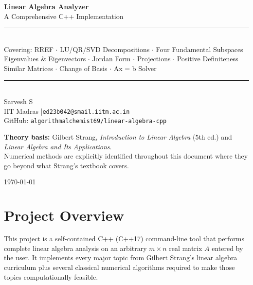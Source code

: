 \documentclass[12pt, a4paper]{article}
\begin{document}
\begin{titlepage}
\centering
\vspace*{2cm}
{\huge\bfseries\color{strangblue} Linear Algebra Analyzer}\\[0.5em]
{\large\color{gray} A Comprehensive C++ Implementation}\\[2em]
\rule{0.7\textwidth}{0.5pt}\\[1.5em]
{\normalsize
  Covering: RREF $\cdot$ LU/QR/SVD Decompositions $\cdot$ Four Fundamental Subspaces\\[0.3em]
  Eigenvalues \& Eigenvectors $\cdot$ Jordan Form $\cdot$ Projections $\cdot$ Positive Definiteness\\[0.3em]
  Similar Matrices $\cdot$ Change of Basis $\cdot$ Ax = b Solver
}\\[1.5em]
\rule{0.7\textwidth}{0.5pt}\\[2em]

{\large Sarvesh S}\\[0.4em]
{\small IIT Madras \quad|\quad \texttt{ed23b042@smail.iitm.ac.in}}\\[1em]
{\small\color{gray} GitHub: \texttt{algorithmalchemist69/linear-algebra-cpp}}\\[3em]

\begin{tcolorbox}[colback=lightblue, colframe=strangblue, width=0.75\textwidth,
  arc=6pt, boxrule=0.8pt]
\centering\small
\textbf{Theory basis:} Gilbert Strang, \emph{Introduction to Linear Algebra}
(5th ed.) and \emph{Linear Algebra and Its Applications}.\\[0.3em]
Numerical methods are explicitly identified throughout this document
where they go beyond what Strang's textbook covers.
\end{tcolorbox}

\vfill
{\small\color{gray}\today}
\end{titlepage}

\tableofcontents
\newpage

\section{Project Overview}

This project is a self-contained C++ (C++17) command-line tool that performs
complete linear algebra analysis on an arbitrary $m \times n$ real matrix $A$
entered by the user.  It implements every major topic from Gilbert Strang's
linear algebra curriculum plus several classical numerical algorithms required
to make those topics computationally feasible.
\end{document}
